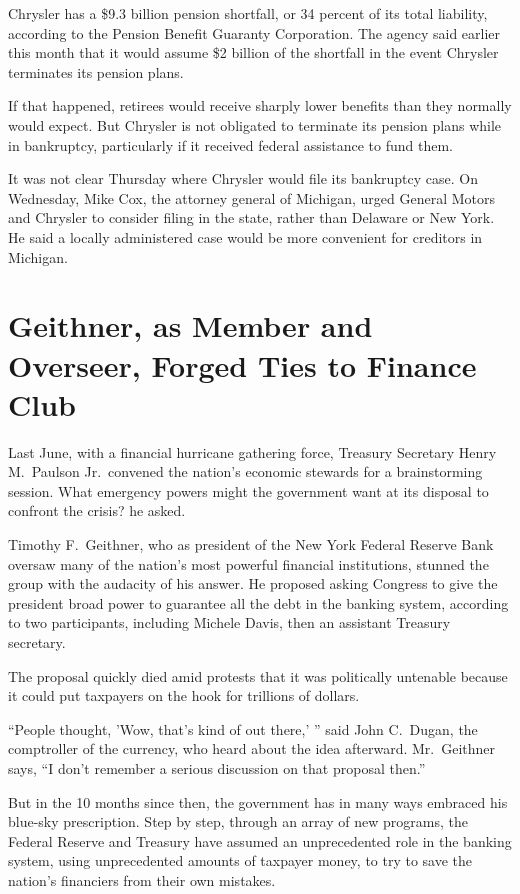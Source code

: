 \documentclass[12pt,a4paper,onecolumn]{article}
\begin{document}
Chrysler has a \$9.3 billion pension shortfall, or 34 percent of its total liability, according to
the Pension Benefit Guaranty Corporation. The agency said earlier this month that it would assume
\$2 billion of the shortfall in the event Chrysler terminates its pension plans.

If that happened, retirees would receive sharply lower benefits than they normally would expect. But
Chrysler is not obligated to terminate its pension plans while in bankruptcy, particularly if it
received federal assistance to fund them.

It was not clear Thursday where Chrysler would file its bankruptcy case. On Wednesday, Mike Cox, the
attorney general of Michigan, urged General Motors and Chrysler to consider filing in the state,
rather than Delaware or New York. He said a locally administered case would be more convenient for
creditors in Michigan.

\section{Geithner, as Member and Overseer, Forged Ties to Finance Club}

Last June, with a financial hurricane gathering force, Treasury Secretary Henry M.~Paulson
Jr.~convened the nation's economic stewards for a brainstorming session. What emergency powers might
the government want at its disposal to confront the crisis? he asked.

Timothy F.~Geithner, who as president of the New York Federal Reserve Bank oversaw many of the
nation's most powerful financial institutions, stunned the group with the audacity of his answer. He
proposed asking Congress to give the president broad power to guarantee all the debt in the banking
system, according to two participants, including Michele Davis, then an assistant Treasury
secretary.

The proposal quickly died amid protests that it was politically untenable because it could put
taxpayers on the hook for trillions of dollars.

``People thought, 'Wow, that's kind of out there,' '' said John C.~Dugan, the comptroller of the
currency, who heard about the idea afterward. Mr.~Geithner says, ``I don't remember a serious
discussion on that proposal then.''

But in the 10 months since then, the government has in many ways embraced his blue-sky prescription.
Step by step, through an array of new programs, the Federal Reserve and Treasury have assumed an
unprecedented role in the banking system, using unprecedented amounts of taxpayer money, to try to
save the nation's financiers from their own mistakes.
\end{document}
